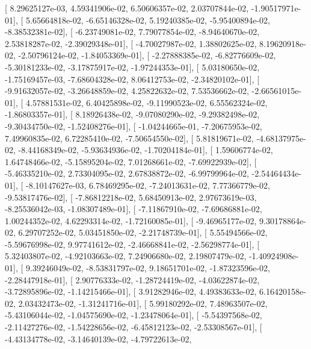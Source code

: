 \documentclass{article}
\begin{document}
       [  8.29625127e-03,   4.59341906e-02,   6.50606357e-02,
          2.03707844e-02,  -1.90517971e-01],
       [  5.65664818e-02,  -6.65146328e-02,   5.19240385e-02,
         -5.95400894e-02,  -8.38532381e-02],
       [ -6.23749081e-02,   7.79077854e-02,  -8.94640670e-02,
          2.53818287e-02,  -2.39029348e-01],
       [ -4.70027987e-02,   1.38802625e-02,   8.19620918e-02,
         -2.50796124e-02,  -1.84053369e-01],
       [ -2.27888385e-02,  -6.82776609e-02,  -5.30181233e-02,
         -3.17875917e-02,  -1.97244353e-01],
       [  5.03180650e-02,  -1.75169457e-03,  -7.68604328e-02,
          8.06412753e-02,  -2.34820102e-01],
       [ -9.91632057e-02,  -3.26648859e-02,   4.25822632e-02,
          7.53536662e-02,  -2.66561015e-01],
       [  4.57881531e-02,   6.40425898e-02,  -9.11990523e-02,
          6.55562324e-02,  -1.86803357e-01],
       [  8.18926438e-02,  -9.07080290e-02,  -9.29382498e-02,
         -9.30434750e-02,  -1.52408276e-01],
       [ -1.04244665e-01,  -7.20675953e-02,   7.49960835e-02,
          6.72285410e-02,  -7.50654550e-02],
       [  5.81819671e-02,  -4.68137975e-02,  -8.44168349e-02,
         -5.93634936e-02,  -1.70204184e-01],
       [  1.59606774e-02,   1.64748466e-02,  -5.15895204e-02,
          7.01268661e-02,  -7.69922939e-02],
       [ -5.46335210e-02,   2.73304095e-02,   2.67838872e-02,
         -6.99799964e-02,  -2.54464434e-01],
       [ -8.10147627e-03,   6.78469295e-02,  -7.24013631e-02,
          7.77366779e-02,  -9.53817476e-02],
       [ -7.86812218e-02,   5.68450913e-02,   2.97673619e-03,
         -8.25536042e-03,  -1.08307489e-01],
       [ -7.11867910e-02,  -7.69686881e-02,   1.00244352e-02,
          4.62293314e-02,  -1.72160085e-01],
       [ -9.46965177e-02,   9.30178864e-02,   6.29707252e-02,
          5.03451850e-02,  -2.21748739e-01],
       [  5.55494566e-02,  -5.59676998e-02,   9.97741612e-02,
         -2.46668841e-02,  -2.56298774e-01],
       [  5.32403807e-02,  -4.92103663e-02,   7.24906680e-02,
          2.19807479e-02,  -1.40924908e-01],
       [  9.39246049e-02,  -8.53831797e-02,   9.18651701e-02,
         -1.87323596e-02,  -2.28447918e-01],
       [  2.90776333e-02,  -1.28724419e-02,  -4.03622874e-02,
         -3.72895896e-02,  -1.14215466e-01],
       [  3.91282946e-02,   4.49383633e-02,   6.16420158e-02,
          2.03432473e-02,  -1.31241716e-01],
       [  5.99180292e-02,   7.48963507e-02,  -5.43106044e-02,
         -1.04575690e-02,  -1.23478064e-01],
       [ -5.54397568e-02,  -2.11427276e-02,  -1.54228656e-02,
         -6.45812123e-02,  -2.53308567e-01],
       [ -4.43134778e-02,  -3.14640139e-02,  -4.79722613e-02,
\end{document}
